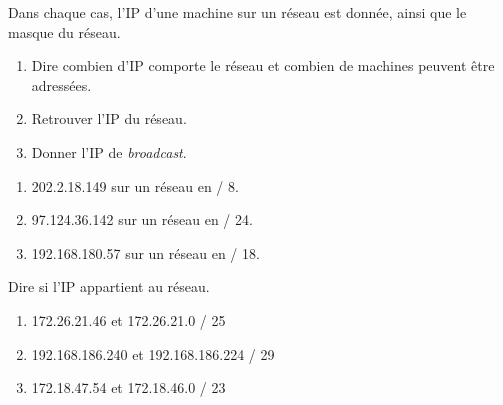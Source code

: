 \documentclass[a4paper,12pt,french]{article}
\begin{document}
\begin{exercice}

Dans chaque cas, l'IP d'une machine sur un réseau est donnée, ainsi que le masque du réseau.
\begin{enumerate}[--]
	\item Dire combien d'IP comporte le réseau et combien de machines peuvent être adressées.
	\item Retrouver l'IP du réseau.
	\item Donner l'IP de \textit{broadcast}.
\end{enumerate}

\begin{enumerate}
\item 202.2.18.149 sur un réseau en / 8.
\item 97.124.36.142 sur un réseau en / 24.
\item 192.168.180.57 sur un réseau en / 18.
\end{enumerate}
\end{exercice}

\begin{exercice}
Dire si l'IP appartient au réseau.
\begin{enumerate}
	\item 172.26.21.46 et 172.26.21.0 / 25
	\item 192.168.186.240 et 192.168.186.224 / 29
	\item 172.18.47.54 et 172.18.46.0 / 23
\end{enumerate}


\end{exercice}
\end{document}
